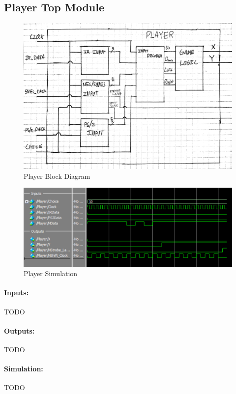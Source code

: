 \documentclass[]{article}
\begin{document}
\subsection{Player Top Module}
\begin{figure}[H]\centering
    \includegraphics[width=\linewidth]{figures/Player_Block.jpg}
    \caption{Player Block Diagram}
    \label{fig:playerBlock}
\end{figure}
\begin{figure}[H]\centering
    \includegraphics[width=\linewidth]{figures/Player_Sim.png}
    \caption{Player Simulation}
    \label{fig:playerSim}
\end{figure}
\paragraph{Inputs:} TODO
\paragraph{Outputs:} TODO
\paragraph{Simulation:} TODO
\end{document}
